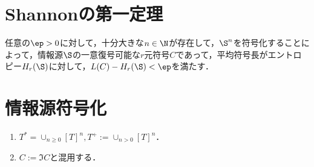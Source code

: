 \documentclass[uplatex,dvipdfmx]{jsreport}
\begin{document}
\section{Shannonの第一定理}

\begin{theorem}
    任意の$\ep>0$に対して，十分大きな$n\in\N$が存在して，$\S^n$を符号化することによって，情報源$\S$の一意復号可能な$r$元符号$C$であって，平均符号長がエントロピー$H_r(\S)$に対して，$L(C)-H_r(\S)<\ep$を満たす．
\end{theorem}

\section{情報源符号化}

\begin{notation}\mbox{}
    \begin{enumerate}
        \item $T^*=\cup_{n\ge0}[T]^n,T^+:=\cup_{n>0}[T]^n$．
        \item $C:=\Im C$と混用する．
    \end{enumerate}
\end{notation}
\end{document}
